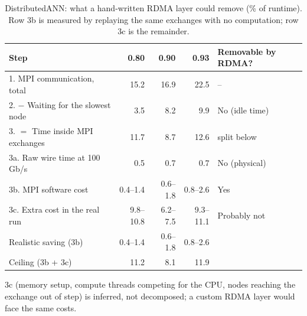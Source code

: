 \begin{table}[t]
\centering
\caption{DistributedANN: what a hand-written RDMA layer could remove (\% of runtime).
Row 3b is measured by replaying the same exchanges with no computation; row 3c is the remainder.}
\label{tab:rdma-dann}
\small
\begin{tabular}{lrrrl}
\toprule
Step & 0.80 & 0.90 & 0.93 & Removable by RDMA? \\
\midrule
1. MPI communication, total                     & 15.2 & 16.9 & 22.5 & -- \\
2. $-$ Waiting for the slowest node             & 3.5  & 8.2  & 9.9  & No (idle time) \\
3. $=$ Time inside MPI exchanges                & 11.7 & 8.7  & 12.6 & split below \\
\quad 3a. Raw wire time at 100\,Gb/s            & 0.5  & 0.7  & 0.7  & No (physical) \\
\quad 3b. MPI software cost                     & 0.4--1.4 & 0.6--1.8 & 0.8--2.6 & Yes \\
\quad 3c. Extra cost in the real run            & 9.8--10.8 & 6.2--7.5 & 9.3--11.1 & Probably not \\
\midrule
Realistic saving (3b)                           & 0.4--1.4 & 0.6--1.8 & 0.8--2.6 & \\
Ceiling (3b + 3c)                               & 11.2 & 8.1 & 11.9 & \\
\bottomrule
\end{tabular}

\vspace{2pt}
{\footnotesize 3c (memory setup, compute threads competing for the CPU, nodes reaching the exchange out of step) is inferred, not decomposed; a custom RDMA layer would face the same costs.}
\end{table}

